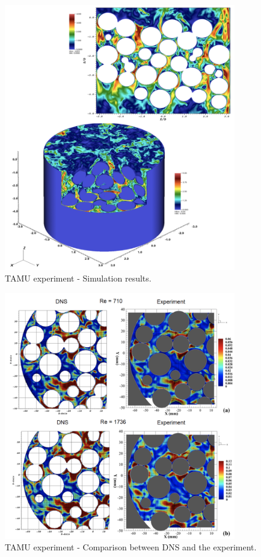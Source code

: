 \begin{figure}[p]
\centering
\includegraphics[width=0.9\textwidth]{Figures/pb_tamu3}
\caption{TAMU experiment - Simulation results.}
\label{f:tamu3}
\end{figure}

\begin{figure}[htb!]
\centering
\includegraphics[width=0.9\textwidth]{Figures/pb_tamu4}
\caption{TAMU experiment - Comparison between DNS and the experiment.}
\label{f:tamu4}
\end{figure}

